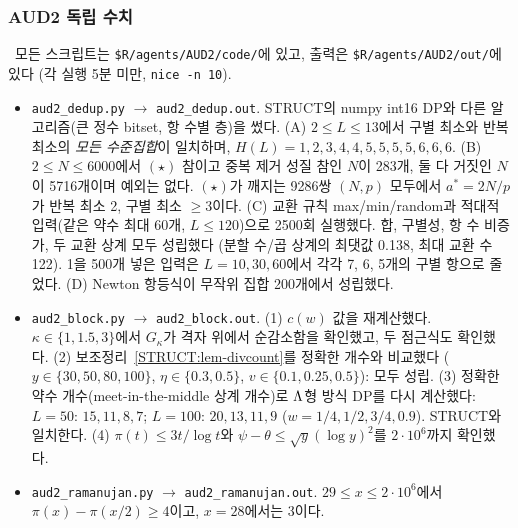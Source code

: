 \subsubsection{AUD2 독립 수치}
\label{AUD2:numerics}
\NUMERIC\ 모든 스크립트는 \texttt{\$R/agents/AUD2/code/}에 있고, 출력은 \texttt{\$R/agents/AUD2/out/}에 있다 (각 실행 5분 미만, \texttt{nice -n 10}).
\begin{itemize}
\item \texttt{aud2\_dedup.py} $\to$ \texttt{aud2\_dedup.out}. STRUCT의 numpy int16 DP와 다른 알고리즘(큰 정수 bitset, 항 수별 층)을 썼다.
(A) $2\le L\le13$에서 구별 최소와 반복 최소의 \emph{모든 수준집합}이 일치하며, $H(L)=1,2,3,4,4,5,5,5,5,6,6,6$.
(B) $2\le N\le6000$에서 $(\star)$ 참이고 중복 제거 성질 참인 $N$이 283개, 둘 다 거짓인 $N$이 5716개이며 예외는 없다. $(\star)$가 깨지는 9286쌍 $(N,p)$ 모두에서 $a^*=2N/p$가 반복 최소 2, 구별 최소 $\ge3$이다.
(C) 교환 규칙 max/min/random과 적대적 입력(같은 약수 최대 60개, $L\le120$)으로 2500회 실행했다. 합, 구별성, 항 수 비증가, 두 교환 상계 모두 성립했다 (분할 수/곱 상계의 최댓값 0.138, 최대 교환 수 122). 1을 500개 넣은 입력은 $L=10,30,60$에서 각각 7, 6, 5개의 구별 항으로 줄었다.
(D) Newton 항등식이 무작위 집합 200개에서 성립했다.
\item \texttt{aud2\_block.py} $\to$ \texttt{aud2\_block.out}.
(1) $c(w)$ 값을 재계산했다. $\kappa\in\{1,1.5,3\}$에서 $G_\kappa$가 격자 위에서 순감소함을 확인했고, 두 점근식도 확인했다.
(2) 보조정리~\ref{STRUCT:lem-divcount}를 정확한 개수와 비교했다 ($y\in\{30,50,80,100\}$, $\eta\in\{0.3,0.5\}$, $v\in\{0.1,0.25,0.5\}$): 모두 성립.
(3) 정확한 약수 개수(meet-in-the-middle 상계 개수)로 $\Lambda$형 방식 DP를 다시 계산했다: $L=50$: $15,11,8,7$; $L=100$: $20,13,11,9$ ($w=1/4,1/2,3/4,0.9$). STRUCT와 일치한다.
(4) $\pi(t)\le3t/\log t$와 $\psi-\theta\le\sqrt y(\log y)^2$를 $2\cdot10^6$까지 확인했다.
\item \texttt{aud2\_ramanujan.py} $\to$ \texttt{aud2\_ramanujan.out}. $29\le x\le2\cdot10^6$에서 $\pi(x)-\pi(x/2)\ge4$이고, $x=28$에서는 3이다.
\end{itemize}

